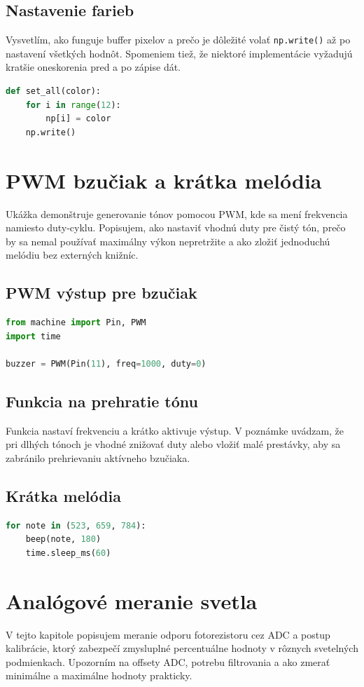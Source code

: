 \subsection*{Nastavenie farieb}
Vysvetlím, ako funguje buffer pixelov a prečo je dôležité volať \texttt{np.write()} až po nastavení všetkých hodnôt. Spomeniem tiež, že niektoré implementácie vyžadujú kratšie oneskorenia pred a po zápise dát.
\begin{lstlisting}[language=Python]
def set_all(color):
	for i in range(12):
		np[i] = color
	np.write()
\end{lstlisting}

\clearpage
\section{PWM bzučiak a krátka melódia}
Ukážka demonštruje generovanie tónov pomocou PWM, kde sa mení frekvencia namiesto duty-cyklu. Popisujem, ako nastaviť vhodnú duty pre čistý tón, prečo by sa nemal používať maximálny výkon nepretržite a ako zložiť jednoduchú melódiu bez externých knižníc.

\subsection*{PWM výstup pre bzučiak}
\begin{lstlisting}[language=Python]
from machine import Pin, PWM
import time

buzzer = PWM(Pin(11), freq=1000, duty=0)
\end{lstlisting}

\subsection*{Funkcia na prehratie tónu}
Funkcia nastaví frekvenciu a krátko aktivuje výstup. V poznámke uvádzam, že pri dlhých tónoch je vhodné znižovať duty alebo vložiť malé prestávky, aby sa zabránilo prehrievaniu aktívneho bzučiaka.

\subsection*{Krátka melódia}
\begin{lstlisting}[language=Python]
for note in (523, 659, 784):
	beep(note, 180)
	time.sleep_ms(60)
\end{lstlisting}

\clearpage
\section{Analógové meranie svetla}
V tejto kapitole popisujem meranie odporu fotorezistoru cez ADC a postup kalibrácie, ktorý zabezpečí zmysluplné percentuálne hodnoty v rôznych svetelných podmienkach. Upozorním na offsety ADC, potrebu filtrovania a ako zmerať minimálne a maximálne hodnoty prakticky.

